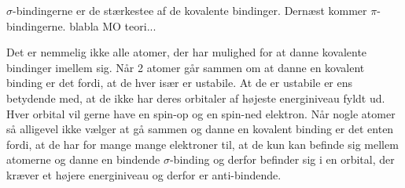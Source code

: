 $\sigma$-bindingerne er de stærkestee af de kovalente bindinger. Dernæst kommer $\pi$-bindingerne. blabla MO teori...


Det er nemmelig ikke alle atomer, der har mulighed for at danne kovalente bindinger imellem sig. Når 2 atomer går sammen om at danne en kovalent binding er det fordi, at de hver især er ustabile. At de er ustabile er ens betydende med, at de ikke har deres orbitaler af højeste energiniveau fyldt ud. Hver orbital vil gerne have en spin-op og en spin-ned elektron. Når nogle atomer så alligevel ikke vælger at gå sammen og danne en kovalent binding er det enten fordi, at de har for mange mange elektroner til, at de kun kan befinde sig mellem atomerne og danne en bindende $\sigma$-binding og derfor befinder sig i en orbital, der kræver et højere energiniveau og derfor er anti-bindende. 
